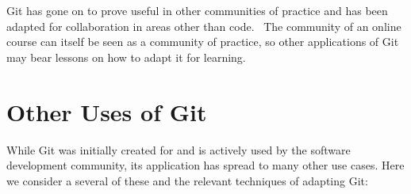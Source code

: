 \documentclass[12pt,twoside]{mitthesis}
\newcommand{\draft}[1]{{\color{blue} #1}}
\begin{document}
\draft{Git has gone on to prove useful in other communities of practice and has been adapted for collaboration in areas other than code.~\cite{sevenwaysgit} The community of an online course can itself be seen as a community of practice, so other applications of Git may bear lessons on how to adapt it for learning.}

\section{Other Uses of Git}

\draft{
While Git was initially created for and is actively used by the software development community, its application has spread to many other use cases. Here we consider a several of these and the relevant techniques of adapting Git:

}
\end{document}
